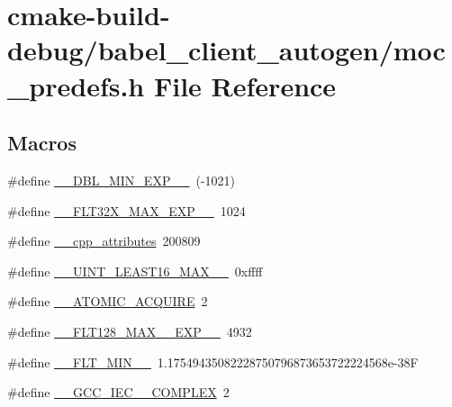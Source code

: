 \hypertarget{cmake-build-debug_2babel__client__autogen_2moc__predefs_8h}{}\section{cmake-\/build-\/debug/babel\+\_\+client\+\_\+autogen/moc\+\_\+predefs.h File Reference}
\label{cmake-build-debug_2babel__client__autogen_2moc__predefs_8h}
\subsection*{Macros}
\begin{DoxyCompactItemize}
\item 
\#define \hyperlink{cmake-build-debug_2babel__client__autogen_2moc__predefs_8h_a63d6f5d1c3371192fe03b3fb06e82400}{\+\_\+\+\_\+\+D\+B\+L\+\_\+\+M\+I\+N\+\_\+\+E\+X\+P\+\_\+\+\_\+}~(-\/1021)
\item 
\#define \hyperlink{cmake-build-debug_2babel__client__autogen_2moc__predefs_8h_a6605c8368985e3b1885a84d1d44ff798}{\+\_\+\+\_\+\+F\+L\+T32\+X\+\_\+\+M\+A\+X\+\_\+\+E\+X\+P\+\_\+\+\_\+}~1024
\item 
\#define \hyperlink{cmake-build-debug_2babel__client__autogen_2moc__predefs_8h_ac47e77d27e7d30f01cde452a9cd218ed}{\+\_\+\+\_\+cpp\+\_\+attributes}~200809
\item 
\#define \hyperlink{cmake-build-debug_2babel__client__autogen_2moc__predefs_8h_a6a762b969d5eea9e6a8db715a5f5a1a9}{\+\_\+\+\_\+\+U\+I\+N\+T\+\_\+\+L\+E\+A\+S\+T16\+\_\+\+M\+A\+X\+\_\+\+\_\+}~0xffff
\item 
\#define \hyperlink{cmake-build-debug_2babel__client__autogen_2moc__predefs_8h_a72e3c30a05bd2bb63d76550e451a438e}{\+\_\+\+\_\+\+A\+T\+O\+M\+I\+C\+\_\+\+A\+C\+Q\+U\+I\+RE}~2
\item 
\#define \hyperlink{cmake-build-debug_2babel__client__autogen_2moc__predefs_8h_af071b48310b9018035302c28cfd0424e}{\+\_\+\+\_\+\+F\+L\+T128\+\_\+\+M\+A\+X\+\_\+\_\+\+E\+X\+P\+\_\+\+\_\+}~4932
\item 
\#define \hyperlink{cmake-build-debug_2babel__client__autogen_2moc__predefs_8h_a6e947aa0a2cb4808d560339fef0d4793}{\+\_\+\+\_\+\+F\+L\+T\+\_\+\+M\+I\+N\+\_\+\+\_\+}~1.\+17549435082228750796873653722224568e-\/38F
\item 
\#define \hyperlink{cmake-build-debug_2babel__client__autogen_2moc__predefs_8h_a779a207685ad2b8ca4cdab02ece517eb}{\+\_\+\+\_\+\+G\+C\+C\+\_\+\+I\+E\+C\+\_\+\_\+\+C\+O\+M\+P\+L\+EX}~2

\end{DoxyCompactItemize}
